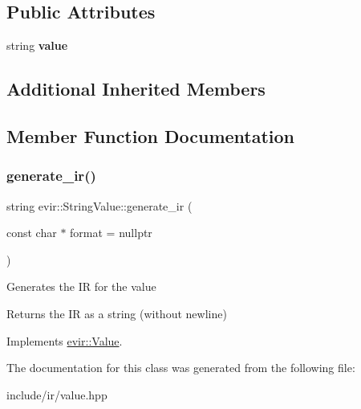 \subsection*{Public Attributes}
\begin{DoxyCompactItemize}
\item 
\mbox{\label{classevir_1_1StringValue_a67f645bf8d1e71c7b8239c65a795d17f}} 
string {\bfseries value}
\end{DoxyCompactItemize}
\subsection*{Additional Inherited Members}


\subsection{Member Function Documentation}
\mbox{\label{classevir_1_1StringValue_ae635609dfe7acf237b71bdb48625712e}} 
\subsubsection{\texorpdfstring{generate\+\_\+ir()}{generate\_ir()}}
{\footnotesize\ttfamily string evir\+::\+String\+Value\+::generate\+\_\+ir (\begin{DoxyParamCaption}\item[{const char $\ast$}]{format = {\ttfamily nullptr} }\end{DoxyParamCaption})\hspace{0.3cm}{\ttfamily [virtual]}}

Generates the IR for the value \begin{DoxyReturn}{Returns}
the IR as a string (without newline) 
\end{DoxyReturn}


Implements \hyperlink{classevir_1_1Value_a3e7e5bc634fd5bba528324076fe2a763}{evir\+::\+Value}.



The documentation for this class was generated from the following file\+:\begin{DoxyCompactItemize}
\item 
include/ir/value.\+hpp\end{DoxyCompactItemize}
